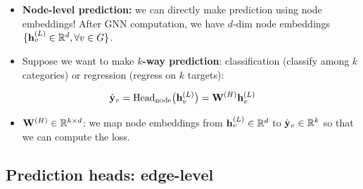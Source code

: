 \begin{itemize}
  \item \textbf{Node-level prediction:} we can directly make prediction using
    node embeddings! After GNN computation, we have $d$-dim node embeddings
    $\{\mathbf{h}_v^{(L)}\in\mathbb{R}^d,\forall v\in G\}$.
  \item Suppose we want to make \textbf{$k$-way prediction}: classification
    (classify among $k$ categories) or regression (regress on $k$ targets):
\end{itemize}
\begin{equation}\label{eq:lec05-headnode}
  \hat{\mathbf{y}}_v = \mathrm{Head}_{\mathrm{node}}\big(\mathbf{h}_v^{(L)}\big)
  = \mathbf{W}^{(H)}\mathbf{h}_v^{(L)}
\end{equation}
\begin{itemize}
  \item[] $\mathbf{W}^{(H)}\in\mathbb{R}^{k\times d}$: we map node embeddings from
    $\mathbf{h}_v^{(L)}\in\mathbb{R}^d$ to $\hat{\mathbf{y}}_v\in\mathbb{R}^k$ so that we can compute the
    loss.
\end{itemize}

\subsection{Prediction heads: edge-level}\label{sec:lec05-edgehead}

